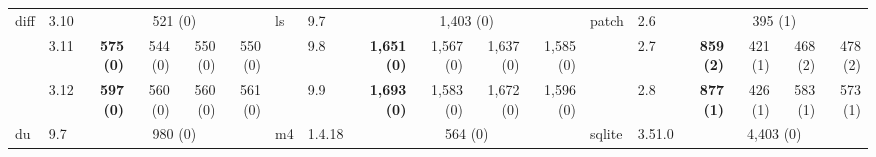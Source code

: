 \begin{table}[]
{\begin{tabular}{l|l|rrrr||l|l|rrrr||l|l|rrrr}
    \multirow{3}{*}{diff}        & 3.10                         & \multicolumn{4}{c||}{521 (0)}                                                                                                                 & \multirow{3}{*}{ls}          & 9.7                          & \multicolumn{4}{c||}{1,403 (0)}                                                                                                               & \multirow{3}{*}{patch}       & 2.6                          & \multicolumn{4}{c}{395 (1)}                                                                                                                 \\ \cmidrule(lr){2-6} \cmidrule(lr){8-12} \cmidrule{14-18} 
                                 & 3.11                         & \multicolumn{1}{r|}{\textbf{575 (0)}}   & \multicolumn{1}{r|}{544 (0)}   & \multicolumn{1}{r|}{550 (0)}   & 550 (0)                          &                              & 9.8                          & \multicolumn{1}{r|}{\textbf{1,651 (0)}} & \multicolumn{1}{r|}{1,567 (0)} & \multicolumn{1}{r|}{1,637 (0)} & 1,585 (0)                        &                              & 2.7                          & \multicolumn{1}{r|}{\textbf{859 (2)}}   & \multicolumn{1}{r|}{421 (1)}   & \multicolumn{1}{r|}{468 (2)}   & 478 (2)                         \\ \cmidrule(lr){2-6} \cmidrule(lr){8-12} \cmidrule{14-18} 
                                 & 3.12                         & \multicolumn{1}{r|}{\textbf{597 (0)}}   & \multicolumn{1}{r|}{560 (0)}   & \multicolumn{1}{r|}{560 (0)}   & 561 (0)                          &                              & 9.9                          & \multicolumn{1}{r|}{\textbf{1,693 (0)}} & \multicolumn{1}{r|}{1,583 (0)} & \multicolumn{1}{r|}{1,672 (0)} & 1,596 (0)                        &                              & 2.8                          & \multicolumn{1}{r|}{\textbf{877 (1)}}   & \multicolumn{1}{r|}{426 (1)}   & \multicolumn{1}{r|}{583 (1)}   & 573 (1)                         \\ \midrule
    \multirow{3}{*}{du}          & 9.7                          & \multicolumn{4}{c||}{980 (0)}                                                                                                                 & \multirow{3}{*}{m4}          & 1.4.18                       & \multicolumn{4}{c||}{564 (0)}                                                                                                                 & \multirow{3}{*}{sqlite}      & 3.51.0                       & \multicolumn{4}{c}{4,403 (0)}                                                                                                               \\ \cmidrule(lr){2-6} \cmidrule(lr){8-12} \cmidrule{14-18} 

\end{tabular}}
\end{table}
